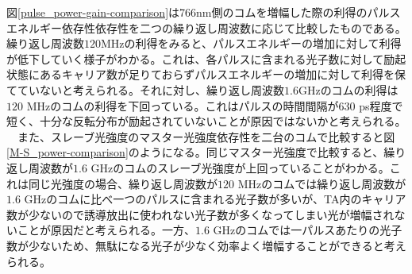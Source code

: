\documentclass[uplatex, dvipdfmx, a4paper, report, papersize, 11pt]{jsbook}
\begin{document}
図\ref{pulse_power-gain-comparison}は766nm側のコムを増幅した際の利得のパルスエネルギー依存性依存性を二つの繰り返し周波数に応じて比較したものである。繰り返し周波数$120 \mathrm{MHz}$の利得をみると、パルスエネルギーの増加に対して利得が低下していく様子がわかる。これは、各パルスに含まれる光子数に対して励起状態にあるキャリア数が足りておらずパルスエネルギーの増加に対して利得を保てていないと考えられる。それに対し、繰り返し周波数$1.6 \mathrm{GHz}$のコムの利得は$120$ MHzのコムの利得を下回っている。これはパルスの時間間隔が$630$ ps程度で短く、十分な反転分布が励起されていないことが原因ではないかと考えられる。\\
　また、スレーブ光強度のマスター光強度依存性を二台のコムで比較すると図\ref{M-S_power-comparison}のようになる。同じマスター光強度で比較すると、繰り返し周波数が$1.6$ GHzのコムのスレーブ光強度が上回っていることがわかる。これは同じ光強度の場合、繰り返し周波数が$120$ MHzのコムでは繰り返し周波数が$1.6$ GHzのコムに比べ一つのパルスに含まれる光子数が多いが、TA内のキャリア数が少ないので誘導放出に使われない光子数が多くなってしまい光が増幅されないことが原因だと考えられる。一方、$1.6$ GHzのコムでは一パルスあたりの光子数が少ないため、無駄になる光子が少なく効率よく増幅することができると考えられる。
\end{document}
